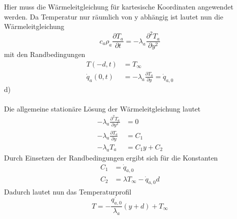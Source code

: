 Hier muss die Wärmeleitgleichung für kartesische Koordinaten angewendet werden. Da Temperatur nur räumlich von y abhängig ist lautet nun die Wärmeleitgleichung
\[
	c_a\rho_a\frac{\partial T_a}{\partial t} = - \lambda_a\frac{\partial^2T_a}{\partial y^2}
\]
mit den Randbedingungen
\begin{align*}
	T(-d,t) &= T_\infty \\
	\dot{q}_a(0,t) &= -\lambda_a\frac{\partial T_a}{\partial y} = \dot{q}_{a,0}
\end{align*}
\newpage
\noindent
d)\\ \\
Die allgemeine stationäre Lösung der Wärmeleitgleichung lautet
\begin{align*}
  - \lambda_a\frac{\partial^2T_a}{\partial y^2} &= 0\\
	 -\lambda_a \frac{\partial T_a}{\partial y} &= C_1 \\
	 -\lambda_a T_a &= C_1y + C_2
\end{align*}
Durch Einsetzen der Randbedingungen ergibt sich für die Konstanten
\begin{align*}
	C_1 &= \dot{q}_{a,0} \\
	C_2 &= \lambda T_\infty - \dot{q}_{a,0}d
\end{align*}
Dadurch lautet nun das Temperaturprofil
\[
	T = -\frac{\dot{q_{a,0}}}{\lambda_a}(y + d) + T_\infty
\]